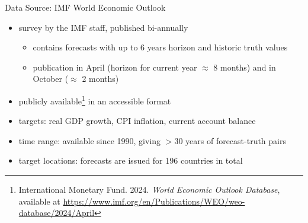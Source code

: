 \documentclass[en]{sdqbeamer}
\begin{document}
\begin{frame}{Data Source: IMF World Economic Outlook}
	\begin{itemize}
		\item survey by the IMF staff, published bi-annually
		\begin{itemize}
            \item contains forecasts with up to 6 years horizon and historic truth values
		    \item publication in April (horizon for current year $\approx$ 8 months) and in October ($\approx$ 2 months)
		\end{itemize}
    \item publicly available\footnote{International Monetary Fund. 2024. \textit{World Economic Outlook Database}, available at \url{https://www.imf.org/en/Publications/WEO/weo-database/2024/April}} in an accessible format
    \item targets: real GDP growth, CPI inflation, current account balance
    \item time range: available since 1990, giving $>$30 years of forecast-truth pairs %
    \item target locations: forecasts are issued for 196 countries in total
	\end{itemize}
\end{frame}
\end{document}
